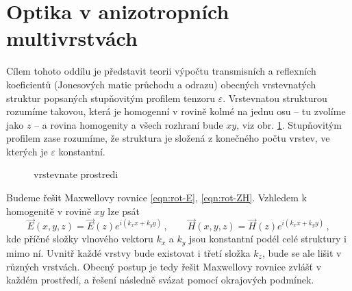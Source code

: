 \section{Optika v anizotropních multivrstvách}
\label{chap:optika-v-multivrstvach}

Cílem tohoto oddílu je představit teorii výpočtu transmisních a reflexních koeficientů (Jonesových matic průchodu a odrazu) obecných vrstevnatých struktur popsaných stupňovitým profilem tenzoru $\varepsilon$.
Vrstevnatou strukturou rozumíme takovou, která je homogenní v rovině kolmé na jednu osu -- tu zvolíme jako $z$ -- a rovina homogenity a všech rozhraní bude $xy$, viz obr. \ref{fig:vrstevnate-prostredi}.
Stupňovitým profilem zase rozumíme, že struktura je složená z konečného počtu vrstev, ve kterých je $\varepsilon$ konstantní.

\begin{figure}[htbp]
    \centering
    
    \caption{vrstevnate prostredi}
    \label{fig:vrstevnate-prostredi}
\end{figure}

Budeme řešit Maxwellovy rovnice \eqref{eqn:rot-E}, \eqref{eqn:rot-ZH}.
Vzhledem k homogenitě v rovině $xy$ lze psát
\begin{equation} 
\label{eqn:pricne-vlnove-vektory}
    \vec{E}(x,y,z)=\vec{E}(z) e^{i(k_xx+k_yy)} \,, \qquad \vec{H}(x,y,z)=\vec{H}(z) e^{i(k_xx+k_yy)} \,,
\end{equation}
kde příčné složky vlnového vektoru $k_x$ a $k_y$ jsou konstantní podél celé struktury i mimo ní.
Uvnitř každé vrstvy bude existovat i třetí složka $k_z$, bude se ale lišit v různých vrstvách.
Obecný postup je tedy řešit Maxwellovy rovnice zvlášť v každém prostředí, a řešení následně svázat pomocí okrajových podmínek.
 
